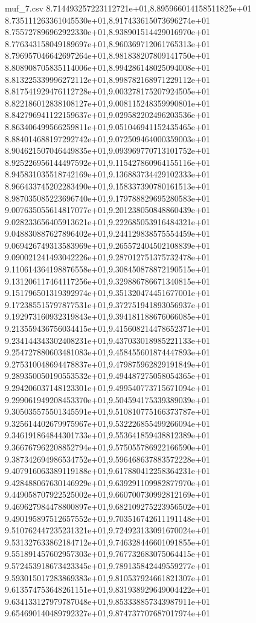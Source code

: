 \begin{filecontents*}{muf_7.csv}
8.714493257223112721e+01,8.895966014158511825e+01
8.735111263361045530e+01,8.917433615073696274e+01
8.755727896962922330e+01,8.938901514429016970e+01
8.776343158049189697e+01,8.960369712061765313e+01
8.796957046642697264e+01,8.981838207809141750e+01
8.808908705835114006e+01,8.994286148025094008e+01
8.813225339996272112e+01,8.998782168971229112e+01
8.817541929476112728e+01,9.003278175207924505e+01
8.822186012838108127e+01,9.008115248359990801e+01
8.842796941122159637e+01,9.029582202496203536e+01
8.863406499566259811e+01,9.051046941152435465e+01
8.884014688197292742e+01,9.072509464000359003e+01
8.904621507046449835e+01,9.093969770713101752e+01
8.925226956144497592e+01,9.115427860964155116e+01
8.945831035518742169e+01,9.136883734429102333e+01
8.966433745202283490e+01,9.158337390780161513e+01
8.987035085223696740e+01,9.179788829695280583e+01
9.007635055614817077e+01,9.201238050848860439e+01
9.028233656405913621e+01,9.222685053916484321e+01
9.048830887627896402e+01,9.244129838575554459e+01
9.069426749313583969e+01,9.265572404502108839e+01
9.090021241493042226e+01,9.287012751375732478e+01
9.110614364198876558e+01,9.308450878872190515e+01
9.131206117464117256e+01,9.329886786671340815e+01
9.151796501319392974e+01,9.351320474451677001e+01
9.172385515797877531e+01,9.372751941893056937e+01
9.192973160932319843e+01,9.394181188676066085e+01
9.213559436756034415e+01,9.415608214478652371e+01
9.234144343302408231e+01,9.437033018985221133e+01
9.254727880603481083e+01,9.458455601874447893e+01
9.275310048694478837e+01,9.479875962829191849e+01
9.289350050190553532e+01,9.494487275058054365e+01
9.294206037148123301e+01,9.499540773715671094e+01
9.299061949208453370e+01,9.504594175339389039e+01
9.305035575501345591e+01,9.510810775166373787e+01
9.325614402679975967e+01,9.532226855499266094e+01
9.346191864844301733e+01,9.553641859438812389e+01
9.366767962208852794e+01,9.575055786922166590e+01
9.387342694986534752e+01,9.596468637883572228e+01
9.407916063389119188e+01,9.617880412258364231e+01
9.428488067630146929e+01,9.639291109982877970e+01
9.449058707922525002e+01,9.660700730992812169e+01
9.469627984478800897e+01,9.682109275223956502e+01
9.490195897512657552e+01,9.703516742611191148e+01
9.510762447235231321e+01,9.724923133091670024e+01
9.531327633862184712e+01,9.746328446601091855e+01
9.551891457602957303e+01,9.767732683075064415e+01
9.572453918673423345e+01,9.789135842449559277e+01
9.593015017283869383e+01,9.810537924661821307e+01
9.613574753648261151e+01,9.831938929649004422e+01
9.634133127979787048e+01,9.853338857343987911e+01
9.654690140489792327e+01,9.874737707687017974e+01

\end{filecontents*}
